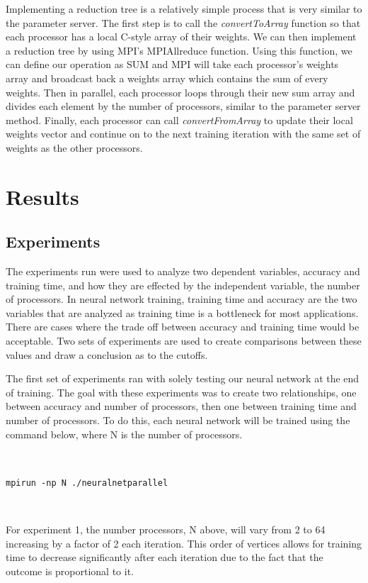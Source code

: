 \documentclass[11pt,twocolumn]{article}
\begin{document}
Implementing a reduction tree is a relatively simple process that is very similar to the parameter server. The first step is to call the \emph{convertToArray} function so that each processor has a local C-style array of their weights. We can then implement a reduction tree by using MPI's MPI\textunderscore Allreduce function. Using this function, we can define our operation as SUM and MPI will take each processor's weights array and broadcast back a weights array which contains the sum of every weights. Then in parallel, each processor loops through their new sum array and divides each element by the number of processors, similar to the parameter server method. Finally, each processor can call \emph{convertFromArray} to update their local weights vector and continue on to the next training iteration with the same set of weights as the other processors. 



\section {Results}\label{results}
\subsection{Experiments}

The experiments run were used to analyze two dependent variables, accuracy and training time, and how they are effected by the independent variable, the number of processors. In neural network training, training time and accuracy are the two variables that are analyzed as training time is a bottleneck for most applications. There are cases where the trade off between accuracy and training time would be acceptable. Two sets of experiments are used to create comparisons between these values and draw a conclusion as to the cutoffs.

The first set of experiments ran with solely testing our neural network at the end of training. The goal with these experiments was to create two relationships, one between accuracy and number of processors, then one between training time and number of processors. To do this, each neural network will be trained using the command below, where N is the number of processors. 

\

\verb|mpirun -np N ./neuralnetparallel|

\

For experiment 1, the number processors, N above, will vary from 2 to 64 increasing by a factor of 2 each iteration. This order of vertices allows for training time to decrease significantly after each iteration due to the fact that the outcome is proportional to it. 
\end{document}

